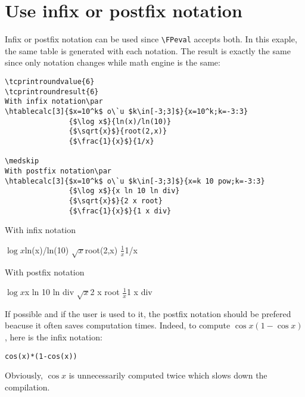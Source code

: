 \documentclass[a4paper,10pt]{article}
\newcommand\mywidth{0.85\linewidth}
\begin{document}
\section{Use infix or postfix notation}
Infix or postfix notation can be used since \verb=\FPeval= accepts both. In this exaple, the same table is generated with each notation. The result is exactly the same since only notation changes while math engine is the same:
\begin{center}
\begin{minipage}{\mywidth}
\begin{lstlisting}
\tcprintroundvalue{6}
\tcprintroundresult{6}
With infix notation\par
\htablecalc[3]{$x=10^k$ o\`u $k\in[-3;3]$}{x=10^k;k=-3:3}
               {$\log x$}{ln(x)/ln(10)}
               {$\sqrt{x}$}{root(2,x)}
               {$\frac{1}{x}$}{1/x}

\medskip
With postfix notation\par
\htablecalc[3]{$x=10^k$ o\`u $k\in[-3;3]$}{x=k 10 pow;k=-3:3}
               {$\log x$}{x ln 10 ln div}
               {$\sqrt{x}$}{2 x root}
               {$\frac{1}{x}$}{1 x div}
\end{lstlisting}
\end{minipage}

With infix notation\par
{}
               {$\log x$}{ln(x)/ln(10)}
               {$\sqrt{x}$}{root(2,x)}
               {$\frac{1}{x}$}{1/x}

\medskip
With postfix notation\par
{}
               {$\log x$}{x ln 10 ln div}
               {$\sqrt{x}$}{2 x root}
               {$\frac{1}{x}$}{1 x div}
\end{center}
If possible and if the user is used to it, the postfix notation should be prefered beacuse it often saves computation times. Indeed, to compute $\cos x(1-\cos x)$, here is the infix notation:
\begin{center}
\begin{minipage}{\mywidth}
\begin{lstlisting}
cos(x)*(1-cos(x))
\end{lstlisting}
\end{minipage}
\end{center}
Obviously, $\cos x$ is unnecessarily computed twice which slows down the compilation.\smallskip
\end{document}
